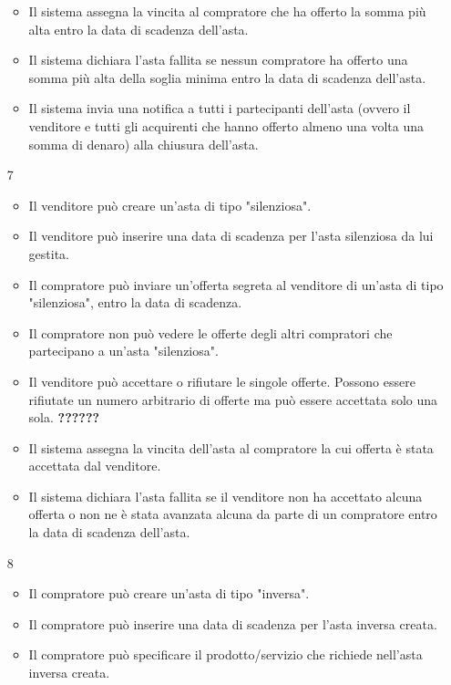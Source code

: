 \begin{itemize}
\begin{itemize}
                    \item Il sistema assegna la vincita al compratore che ha offerto la somma più alta entro la data di scadenza dell'asta.
                    \item Il sistema dichiara l'asta fallita se nessun compratore ha offerto una somma più alta della soglia minima entro la data di scadenza dell'asta.
                    \item Il sistema invia una notifica a tutti i partecipanti dell'asta (ovvero il venditore e tutti gli acquirenti che hanno offerto almeno una volta una somma di denaro) alla chiusura dell'asta.
                \end{itemize}
            \item[7] 
                \begin{itemize}
                    \item Il venditore può creare un'asta di tipo "silenziosa".
                    \item Il venditore può inserire una data di scadenza per l'asta silenziosa da lui gestita.
                    \item Il compratore può inviare un'offerta segreta al venditore di un'asta di tipo "silenziosa", entro la data di scadenza.
                    \item Il compratore non può vedere le offerte degli altri compratori che partecipano a un'asta "silenziosa".
                    \item Il venditore può accettare o rifiutare le singole offerte. Possono essere rifiutate un numero arbitrario di offerte ma può essere accettata solo una sola. \textbf{??????}
                    \item Il sistema assegna la vincita dell'asta al compratore la cui offerta è stata accettata dal venditore.
                    \item Il sistema dichiara l'asta fallita se il venditore non ha accettato alcuna offerta o non ne è stata avanzata alcuna da parte di un compratore entro la data di scadenza dell'asta.
                \end{itemize}
            \item[8]
                \begin{itemize}            
                    \item Il compratore può creare un'asta di tipo "inversa".
                    \item Il compratore può inserire una data di scadenza per l'asta inversa creata.
                    \item Il compratore può specificare il prodotto/servizio che richiede nell'asta inversa creata.

\end{itemize}
\end{itemize}

